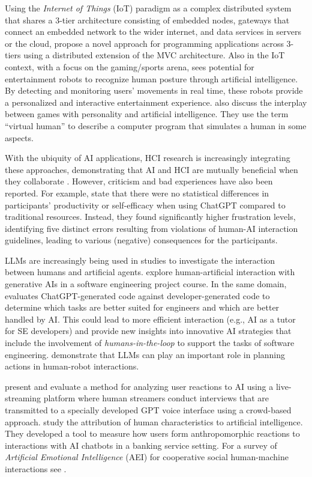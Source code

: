 Using the {\em Internet of Things} (IoT) paradigm as a complex distributed system that shares a 3-tier architecture consisting of embedded nodes, gateways that connect an embedded network to the wider internet, and data services in servers or the cloud, \cite{RiliskisHL15} propose a novel approach for programming applications across 3-tiers using a distributed extension of the MVC architecture. 
Also in the IoT context, with a focus on the gaming/sports arena, \cite{Chen25} sees 
%
%
potential for entertainment robots to recognize human posture through artificial intelligence. 
By detecting and monitoring users' movements in real time, these robots provide a personalized and interactive entertainment experience.
\cite{CaciD20} also discuss the interplay between games with personality and artificial intelligence. They use the term ``virtual human'' to describe a computer program that simulates a human in some aspects.


With the ubiquity of AI applications, HCI research is increasingly integrating these approaches, demonstrating that AI and HCI are mutually beneficial when they collaborate \cite{PandaR24}.
%
However, criticism and bad experiences have also been reported. 
For example, \cite{Choudhuri2024} state that there were no statistical differences in participants' productivity or self-efficacy when using ChatGPT compared to traditional resources.
Instead, they found significantly higher frustration levels, identifying five distinct errors resulting from violations of human-AI interaction guidelines, leading to various (negative) consequences for the participants.

LLMs are increasingly being used in studies to investigate the interaction between humans and artificial agents. 
\cite{BorghoffMM24} explore human-artificial interaction with generative AIs in a software engineering project course.
In the same domain, \cite{Nascimento2023} evaluates ChatGPT-generated code against developer-generated code to determine which tasks are better suited for engineers and which are better handled by AI. This could lead to more efficient interaction (e.g., AI as a tutor for SE developers) and provide new insights into innovative AI strategies that include the involvement of {\em humans-in-the-loop} to support the tasks of software engineering.
%
\cite{CapitanelliM24} demonstrate that LLMs can play an important role in planning actions in human-robot interactions.

\cite{GiudiciLTB24} present and evaluate a method for analyzing user reactions to AI using a live-streaming platform where human streamers conduct interviews that are transmitted to a specially developed GPT voice interface using a crowd-based approach.
\cite{KimI23} study the attribution of human characteristics to artificial intelligence. They developed a tool to measure how users form anthropomorphic reactions to interactions with AI chatbots in a banking service setting. 
For a survey of {\em Artificial Emotional Intelligence} (AEI) for cooperative social human-machine interactions see \cite{AhmadiH23}.

